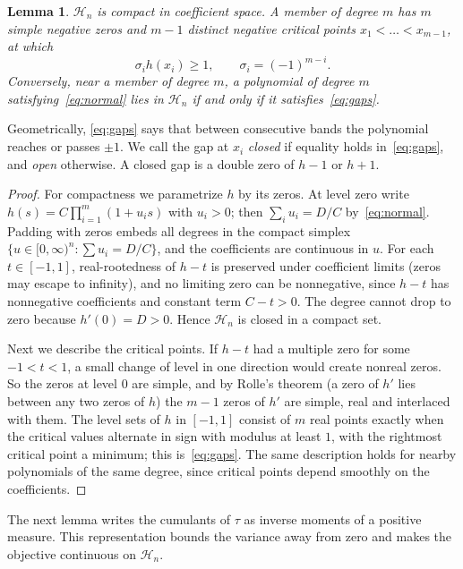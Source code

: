 \documentclass[11pt]{article}
\newtheorem{lemma}[theorem]{Lemma}
\theoremstyle{remark}
\newcommand{\HH}{\mathcal H}
\begin{document}
\begin{lemma}\label{lem:compact}
$\HH_n$ is compact in coefficient space. A member of degree $m$ has $m$
simple negative zeros and $m-1$ distinct negative critical points
$x_1<\dots<x_{m-1}$, at which
\begin{equation}\label{eq:gaps}
\sigma_ih(x_i)\ge1,\qquad\sigma_i=(-1)^{m-i}.
\end{equation}
Conversely, near a member of degree $m$, a polynomial of degree $m$
satisfying~\eqref{eq:normal} lies in $\HH_n$ if and only if it
satisfies~\eqref{eq:gaps}.
\end{lemma}

Geometrically, \eqref{eq:gaps} says that between consecutive bands the
polynomial reaches or passes $\pm1$. We call the gap at $x_i$
\emph{closed} if equality holds in~\eqref{eq:gaps}, and \emph{open}
otherwise. A closed gap is a double zero of $h-1$ or $h+1$.

\begin{proof}
For compactness we parametrize $h$ by its zeros. At level zero write
$h(s)=C\prod_{i=1}^m(1+u_is)$ with $u_i>0$; then $\sum_iu_i=D/C$
by~\eqref{eq:normal}. Padding with zeros embeds all degrees in the compact
simplex $\{u\in[0,\infty)^n:\sum u_i=D/C\}$, and the coefficients are
continuous in $u$. For each $t\in[-1,1]$, real-rootedness of $h-t$ is
preserved under coefficient limits (zeros may escape to infinity), and no
limiting zero can be nonnegative, since $h-t$ has nonnegative coefficients
and constant term $C-t>0$. The degree cannot drop to zero because
$h'(0)=D>0$. Hence $\HH_n$ is closed in a compact set.

Next we describe the critical points. If $h-t$ had a multiple zero for some
$-1<t<1$, a small change of level in one direction would create nonreal
zeros. So the zeros at level $0$ are simple, and by Rolle's theorem (a zero
of $h'$ lies between any two zeros of $h$) the $m-1$ zeros of $h'$ are
simple, real and interlaced with them. The level sets of $h$ in $[-1,1]$
consist of $m$ real points exactly when the critical values alternate in
sign with modulus at least $1$, with the rightmost critical point a
minimum; this is~\eqref{eq:gaps}. The same description holds for nearby
polynomials of the same degree, since critical points depend smoothly on
the coefficients.
\end{proof}

The next lemma writes the cumulants of $\tau$ as inverse moments of a
positive measure. This representation bounds the variance away from zero
and makes the objective continuous on $\HH_n$.
\end{document}
